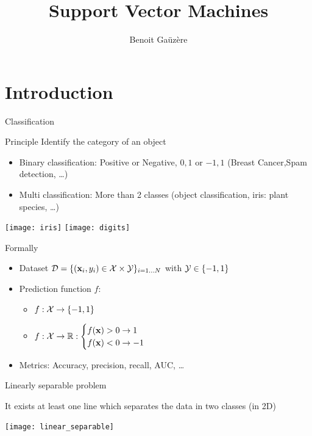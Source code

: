 \documentclass[11pt, pdf, compress, handout]{beamer}
\title{Support Vector Machines}
\author{Benoit Gaüzère}
\institute{INSA Rouen Normandie - Laboratoire LITIS}
\begin{document}
\maketitle

\section{Introduction}
\label{sec:org1f84628}
\begin{frame}[allowframebreaks]{Classification}
  \begin{block}{Principle}
    Identify the category of an object
    \begin{itemize}
    \item Binary classification: Positive or Negative, ${0,1}$ or
      ${-1,1}$ (Breast Cancer,Spam detection, \dots)
    \item Multi classification: More than 2 classes (object
      classification, iris: plant species, \dots) 
    \end{itemize}
  \end{block}

  \texttt{[image: iris]}
  \texttt{[image: digits]}

  \framebreak 
  \begin{block}{Formally}
    \begin{itemize}
    \item Dataset ${\mathcal{D}} = \{({\mathbf{x}}_i,y_i) \in {\mathcal{X}} \times {\mathcal{Y}}\}_{i=1 \dots
        N}$ with ${\mathcal{Y}} \in \{-1,1\}$
    \item Prediction function $f$:
      \begin{itemize}
      \item $f : {\mathcal{X}} \to \{-1,1\}$
      \item  $f : {\mathcal{X}} \to {\mathbb{R}}:
        \begin{cases}
          f({\mathbf{x}}) > 0 \to 1 \\
          f({\mathbf{x}}) < 0 \to -1
        \end{cases}$
      \end{itemize}
    \item Metrics: Accuracy, precision, recall, AUC, \dots 
    \end{itemize}
  \end{block}
\end{frame}
\begin{frame}{Linearly separable problem}
  \begin{block}{}
  It exists  at least one line which separates the data in two classes (in 2D)
  
  \begin{center}
    \texttt{[image: linear\_separable]}
  \end{center}
  \end{block}
  \end{frame}
\end{document}
